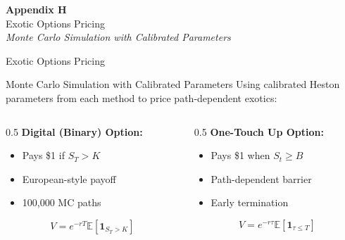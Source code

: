 \documentclass{beamer}
\begin{document}
\begin{frame}
    \begin{center}
        \vspace{2cm}
        {\LARGE \textbf{Appendix H}}\\[0.5cm]
        {\Large Exotic Options Pricing}\\[1cm]
        \textit{Monte Carlo Simulation with Calibrated Parameters}
    \end{center}
\end{frame}

\begin{frame}{Exotic Options Pricing}
    \begin{block}{Monte Carlo Simulation with Calibrated Parameters}
        Using calibrated Heston parameters from each method to price path-dependent exotics:
    \end{block}

    \vspace{0.2cm}

    \begin{columns}
        \begin{column}{0.5\textwidth}
            \textbf{Digital (Binary) Option:}
            \begin{itemize}
                \item Pays \$1 if $S_T > K$
                \item European-style payoff
                \item 100,000 MC paths
            \end{itemize}
            \begin{equation}
                V = e^{-rT} \mathbb{E}[\mathbf{1}_{S_T > K}]
            \end{equation}
        \end{column}
        \begin{column}{0.5\textwidth}
            \textbf{One-Touch Up Option:}
            \begin{itemize}
                \item Pays \$1 when $S_t \geq B$
                \item Path-dependent barrier
                \item Early termination
            \end{itemize}
            \begin{equation}
                V = e^{-r\tau} \mathbb{E}[\mathbf{1}_{\tau \leq T}]
            \end{equation}
        \end{column}
    \end{columns}
\end{frame}
\end{document}
